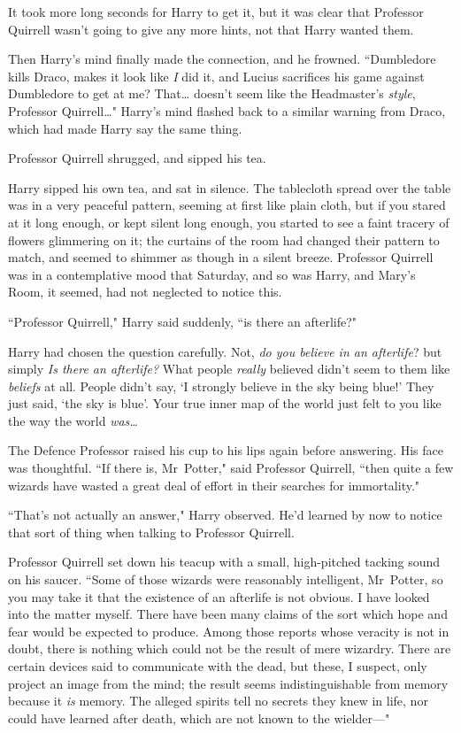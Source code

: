 It took more long seconds for Harry to get it, but it was clear that Professor Quirrell wasn't going to give any more hints, not that Harry wanted them.

Then Harry's mind finally made the connection, and he frowned. ``Dumbledore kills Draco, makes it look like \emph{I} did it, and Lucius sacrifices his game against Dumbledore to get at me? That{\ldots} doesn't seem like the Headmaster's \emph{style}, Professor Quirrell{\ldots}" Harry's mind flashed back to a similar warning from Draco, which had made Harry say the same thing.

Professor Quirrell shrugged, and sipped his tea.

Harry sipped his own tea, and sat in silence. The tablecloth spread over the table was in a very peaceful pattern, seeming at first like plain cloth, but if you stared at it long enough, or kept silent long enough, you started to see a faint tracery of flowers glimmering on it; the curtains of the room had changed their pattern to match, and seemed to shimmer as though in a silent breeze. Professor Quirrell was in a contemplative mood that Saturday, and so was Harry, and Mary's Room, it seemed, had not neglected to notice this.

``Professor Quirrell," Harry said suddenly, ``is there an afterlife?"

Harry had chosen the question carefully. Not, \emph{do you believe in an afterlife}? but simply \emph{Is there an afterlife?} What people \emph{really} believed didn't seem to them like \emph{beliefs} at all. People didn't say, `I strongly believe in the sky being blue!' They just said, `the sky is blue'. Your true inner map of the world just felt to you like the way the world \emph{was{\ldots}}

The Defence Professor raised his cup to his lips again before answering. His face was thoughtful. ``If there is, Mr~Potter," said Professor Quirrell, ``then quite a few wizards have wasted a great deal of effort in their searches for immortality."

``That's not actually an answer," Harry observed. He'd learned by now to notice that sort of thing when talking to Professor Quirrell.

Professor Quirrell set down his teacup with a small, high-pitched tacking sound on his saucer. ``Some of those wizards were reasonably intelligent, Mr~Potter, so you may take it that the existence of an afterlife is not obvious. I have looked into the matter myself. There have been many claims of the sort which hope and fear would be expected to produce. Among those reports whose veracity is not in doubt, there is nothing which could not be the result of mere wizardry. There are certain devices said to communicate with the dead, but these, I suspect, only project an image from the mind; the result seems indistinguishable from memory because it \emph{is} memory. The alleged spirits tell no secrets they knew in life, nor could have learned after death, which are not known to the wielder—"

